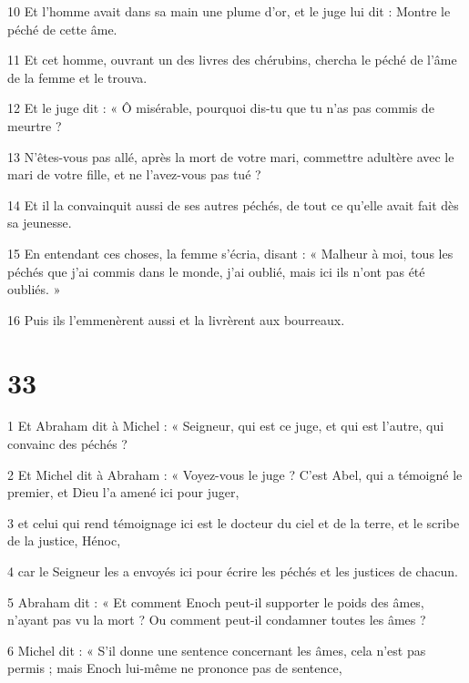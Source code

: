 \par 10 Et l'homme avait dans sa main une plume d'or, et le juge lui dit : Montre le péché de cette âme.

\par 11 Et cet homme, ouvrant un des livres des chérubins, chercha le péché de l'âme de la femme et le trouva.

\par 12 Et le juge dit : « Ô misérable, pourquoi dis-tu que tu n'as pas commis de meurtre ?

\par 13 N'êtes-vous pas allé, après la mort de votre mari, commettre adultère avec le mari de votre fille, et ne l'avez-vous pas tué ?

\par 14 Et il la convainquit aussi de ses autres péchés, de tout ce qu'elle avait fait dès sa jeunesse.

\par 15 En entendant ces choses, la femme s'écria, disant : « Malheur à moi, tous les péchés que j'ai commis dans le monde, j'ai oublié, mais ici ils n'ont pas été oubliés. »

\par 16 Puis ils l'emmenèrent aussi et la livrèrent aux bourreaux.

\chapter{33}

\par 1 Et Abraham dit à Michel : « Seigneur, qui est ce juge, et qui est l'autre, qui convainc des péchés ?

\par 2 Et Michel dit à Abraham : « Voyez-vous le juge ? C'est Abel, qui a témoigné le premier, et Dieu l'a amené ici pour juger,

\par 3 et celui qui rend témoignage ici est le docteur du ciel et de la terre, et le scribe de la justice, Hénoc,

\par 4 car le Seigneur les a envoyés ici pour écrire les péchés et les justices de chacun.

\par 5 Abraham dit : « Et comment Enoch peut-il supporter le poids des âmes, n'ayant pas vu la mort ? Ou comment peut-il condamner toutes les âmes ?

\par 6 Michel dit : « S'il donne une sentence concernant les âmes, cela n'est pas permis ; mais Enoch lui-même ne prononce pas de sentence,

